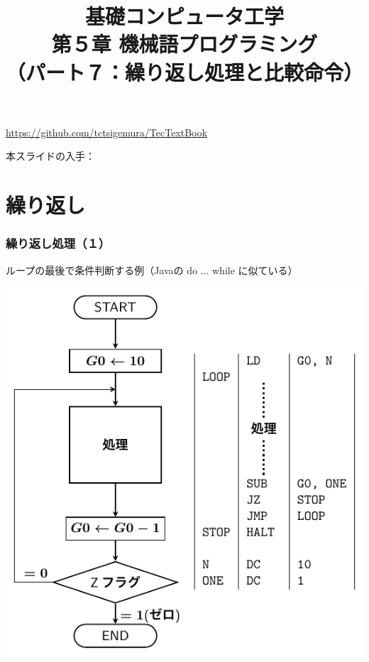 \documentclass[handout]{beamer}        %
\begin{document}
\title{基礎コンピュータ工学\\第５章 機械語プログラミング\\
       （パート７：繰り返し処理と比較命令）}
\date{}

\begin{frame}
  \titlepage
  \centerline{\url{https://github.com/tctsigemura/TecTextBook}}
  \vfill
  \centerline{本スライドの入手：
    }
\end{frame}


\section{繰り返し}
\begin{frame}
  \frametitle{繰り返し処理（１）}
  ループの最後で条件判断する例（Javaの do ... while に似ている）\\
  \vfill
  \centerline{\includegraphics[scale=0.7]{../Tikz/flow2.pdf}}
  \vfill
\end{frame}
\end{document}
